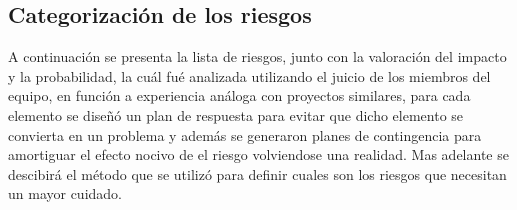 \subsection{Categorización de los riesgos}

A continuación se presenta la lista de riesgos, junto con la valoración del impacto y la probabilidad, la cuál fué analizada utilizando el juicio de los miembros del equipo, en función a experiencia análoga con proyectos similares, para cada elemento se diseñó un plan de respuesta para evitar que dicho elemento se convierta en un problema y además se generaron planes de contingencia para amortiguar el efecto nocivo de el riesgo volviendose una realidad. Mas adelante se descibirá el método que se utilizó para definir cuales son los riesgos que necesitan un mayor cuidado.

